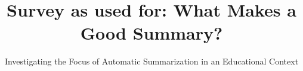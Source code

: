 \documentclass[sigconf,review=true,anonymous=true,screen=true]{acmart}
\begin{document}
\title[Survey as used for: What Makes a Good Summary?]{Survey as used for: What Makes a Good Summary?}
\subtitle{Investigating the Focus of Automatic Summarization in an Educational Context}
\maketitle



\end{document}
